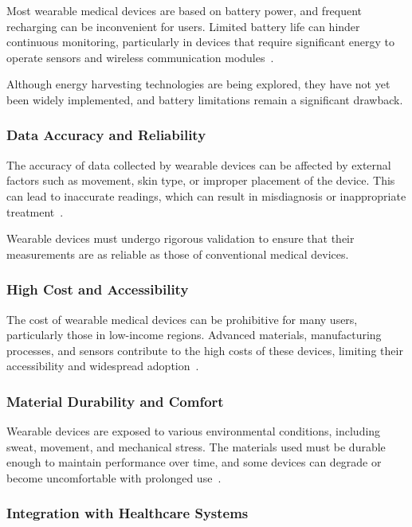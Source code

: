 \documentclass[journal]{IEEEtran}
\begin{document}
        Most wearable medical devices are based on battery power, and frequent recharging can be inconvenient for users. Limited battery life can hinder continuous monitoring, particularly in devices that require significant energy to operate sensors and wireless communication modules~\cite{Ates2022}.

        Although energy harvesting technologies are being explored, they have not yet been widely implemented, and battery limitations remain a significant drawback.

        \subsubsection{Data Accuracy and Reliability}

        The accuracy of data collected by wearable devices can be affected by external factors such as movement, skin type, or improper placement of the device. This can lead to inaccurate readings, which can result in misdiagnosis or inappropriate treatment~\cite{Lu2020}.

        Wearable devices must undergo rigorous validation to ensure that their measurements are as reliable as those of conventional medical devices.

        \subsubsection{High Cost and Accessibility}

        The cost of wearable medical devices can be prohibitive for many users, particularly those in low-income regions. Advanced materials, manufacturing processes, and sensors contribute to the high costs of these devices, limiting their accessibility and widespread adoption~\cite{Liu2018}.

        \subsubsection{Material Durability and Comfort}

        Wearable devices are exposed to various environmental conditions, including sweat, movement, and mechanical stress. The materials used must be durable enough to maintain performance over time, and some devices can degrade or become uncomfortable with prolonged use~\cite{Luo2024}.

        \subsubsection{Integration with Healthcare Systems}
\end{document}
